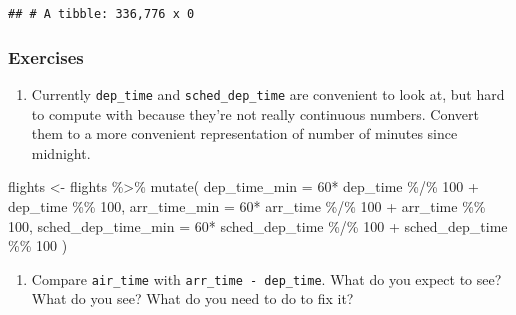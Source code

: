 \documentclass[
]{article}
\newenvironment{Shaded}{\begin{snugshade}}{\end{snugshade}}
\newcommand{\AttributeTok}[1]{\textcolor[rgb]{0.77,0.63,0.00}{#1}}
\newcommand{\DecValTok}[1]{\textcolor[rgb]{0.00,0.00,0.81}{#1}}
\newcommand{\FunctionTok}[1]{\textcolor[rgb]{0.00,0.00,0.00}{#1}}
\newcommand{\NormalTok}[1]{#1}
\newcommand{\OtherTok}[1]{\textcolor[rgb]{0.56,0.35,0.01}{#1}}
\newcommand{\SpecialCharTok}[1]{\textcolor[rgb]{0.00,0.00,0.00}{#1}}
\providecommand{\tightlist}{%
  \setlength{\itemsep}{0pt}\setlength{\parskip}{0pt}}
\begin{document}
\begin{verbatim}
## # A tibble: 336,776 x 0
\end{verbatim}

\hypertarget{exercises-3}{%
\subsubsection{Exercises}\label{exercises-3}}

\begin{enumerate}
\def\labelenumi{\arabic{enumi}.}
\tightlist
\item
  Currently \texttt{dep\_time} and \texttt{sched\_dep\_time} are
  convenient to look at, but hard to compute with because they're not
  really continuous numbers. Convert them to a more convenient
  representation of number of minutes since midnight.
\end{enumerate}

\begin{Shaded}
\begin{Highlighting}[]
\NormalTok{flights }\OtherTok{\textless{}{-}}\NormalTok{ flights }\SpecialCharTok{\%\textgreater{}\%}
  \FunctionTok{mutate}\NormalTok{(}
    \AttributeTok{dep\_time\_min =} \DecValTok{60}\SpecialCharTok{*}\NormalTok{ dep\_time }\SpecialCharTok{\%/\%} \DecValTok{100} \SpecialCharTok{+}\NormalTok{ dep\_time }\SpecialCharTok{\%\%} \DecValTok{100}\NormalTok{,}
    \AttributeTok{arr\_time\_min =} \DecValTok{60}\SpecialCharTok{*}\NormalTok{ arr\_time }\SpecialCharTok{\%/\%} \DecValTok{100} \SpecialCharTok{+}\NormalTok{ arr\_time }\SpecialCharTok{\%\%} \DecValTok{100}\NormalTok{,}
    \AttributeTok{sched\_dep\_time\_min =} \DecValTok{60}\SpecialCharTok{*}\NormalTok{ sched\_dep\_time }\SpecialCharTok{\%/\%} \DecValTok{100} \SpecialCharTok{+}\NormalTok{ sched\_dep\_time }\SpecialCharTok{\%\%} \DecValTok{100}
\NormalTok{    )}
\end{Highlighting}
\end{Shaded}

\begin{enumerate}
\def\labelenumi{\arabic{enumi}.}
\tightlist
\item
  Compare \texttt{air\_time} with \texttt{arr\_time\ -\ dep\_time}. What
  do you expect to see? What do you see? What do you need to do to fix
  it?
\end{enumerate}

\begin{Shaded}
\end{Shaded}
\end{document}
